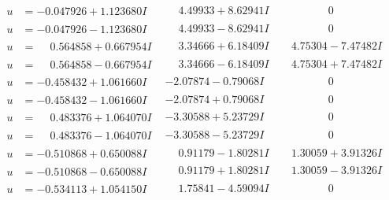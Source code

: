 \documentclass[1p]{elsarticle_modified}
\theoremstyle{definition}
\begin{document}
$$\begin{array}{c|c|c}
\begin{aligned}
u &= -0.047926 + 1.123680 I\end{aligned}
 & \phantom{-}4.49933 + 8.62941 I & \phantom{-0.000000 } 0 \\ \hline\begin{aligned}
u &= -0.047926 - 1.123680 I\end{aligned}
 & \phantom{-}4.49933 - 8.62941 I & \phantom{-0.000000 } 0 \\ \hline\begin{aligned}
u &= \phantom{-}0.564858 + 0.667954 I\end{aligned}
 & \phantom{-}3.34666 + 6.18409 I & \phantom{-}4.75304 - 7.47482 I \\ \hline\begin{aligned}
u &= \phantom{-}0.564858 - 0.667954 I\end{aligned}
 & \phantom{-}3.34666 - 6.18409 I & \phantom{-}4.75304 + 7.47482 I \\ \hline\begin{aligned}
u &= -0.458432 + 1.061660 I\end{aligned}
 & -2.07874 - 0.79068 I & \phantom{-0.000000 } 0 \\ \hline\begin{aligned}
u &= -0.458432 - 1.061660 I\end{aligned}
 & -2.07874 + 0.79068 I & \phantom{-0.000000 } 0 \\ \hline\begin{aligned}
u &= \phantom{-}0.483376 + 1.064070 I\end{aligned}
 & -3.30588 + 5.23729 I & \phantom{-0.000000 } 0 \\ \hline\begin{aligned}
u &= \phantom{-}0.483376 - 1.064070 I\end{aligned}
 & -3.30588 - 5.23729 I & \phantom{-0.000000 } 0 \\ \hline\begin{aligned}
u &= -0.510868 + 0.650088 I\end{aligned}
 & \phantom{-}0.91179 - 1.80281 I & \phantom{-}1.30059 + 3.91326 I \\ \hline\begin{aligned}
u &= -0.510868 - 0.650088 I\end{aligned}
 & \phantom{-}0.91179 + 1.80281 I & \phantom{-}1.30059 - 3.91326 I \\ \hline\begin{aligned}
u &= -0.534113 + 1.054150 I\end{aligned}
 & \phantom{-}1.75841 - 4.59094 I & \phantom{-0.000000 } 0 \\ \hline\begin{aligned}

\end{aligned}
\end{array}$$
\end{document}
